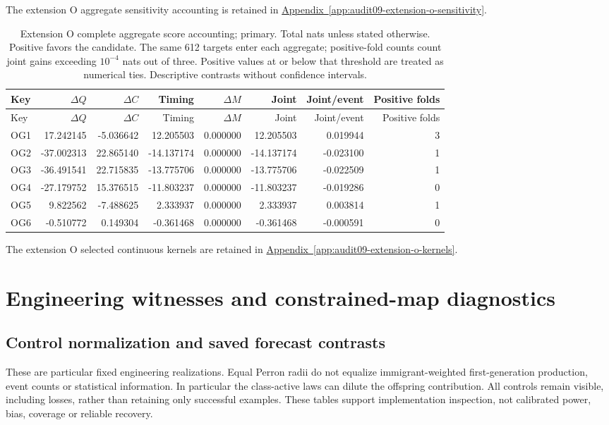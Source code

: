\noindent The extension O aggregate sensitivity accounting is retained in \hyperref[app:audit09-extension-o-sensitivity]{Appendix~\ref{app:audit09-extension-o-sensitivity}}.

{\small
\setlength{\tabcolsep}{3pt}
\begin{longtable}{lrrrrrrr}
\caption{Extension O complete aggregate score accounting; primary. Total nats unless stated otherwise. Positive favors the candidate. The same 612 targets enter each aggregate; positive-fold counts count joint gains exceeding $10^{-4}$ nats out of three. Positive values at or below that threshold are treated as numerical ties. Descriptive contrasts without confidence intervals.}\label{tab:OG-primary}\\
\toprule
Key & $\Delta Q$ & $\Delta C$ & Timing & $\Delta M$ & Joint & Joint/event & Positive folds\\\midrule
\endfirsthead
\toprule
Key & $\Delta Q$ & $\Delta C$ & Timing & $\Delta M$ & Joint & Joint/event & Positive folds\\\midrule
\endhead
OG1 & 17.242145 & -5.036642 & 12.205503 & 0.000000 & 12.205503 & 0.019944 & 3\\
OG2 & -37.002313 & 22.865140 & -14.137174 & 0.000000 & -14.137174 & -0.023100 & 1\\
OG3 & -36.491541 & 22.715835 & -13.775706 & 0.000000 & -13.775706 & -0.022509 & 1\\
OG4 & -27.179752 & 15.376515 & -11.803237 & 0.000000 & -11.803237 & -0.019286 & 0\\
OG5 & 9.822562 & -7.488625 & 2.333937 & 0.000000 & 2.333937 & 0.003814 & 1\\
OG6 & -0.510772 & 0.149304 & -0.361468 & 0.000000 & -0.361468 & -0.000591 & 0\\
\bottomrule
\end{longtable}
}

\noindent The extension O selected continuous kernels are retained in \hyperref[app:audit09-extension-o-kernels]{Appendix~\ref{app:audit09-extension-o-kernels}}.

\section{Engineering witnesses and constrained-map diagnostics}
\subsection{Control normalization and saved forecast contrasts}
These are particular fixed engineering realizations. Equal Perron radii do
not equalize immigrant-weighted first-generation production, event counts or
statistical information. In particular the class-active laws can dilute the
offspring contribution. All controls remain visible, including losses, rather
than retaining only successful examples. These tables support implementation
inspection, not calibrated power, bias, coverage or reliable recovery.

